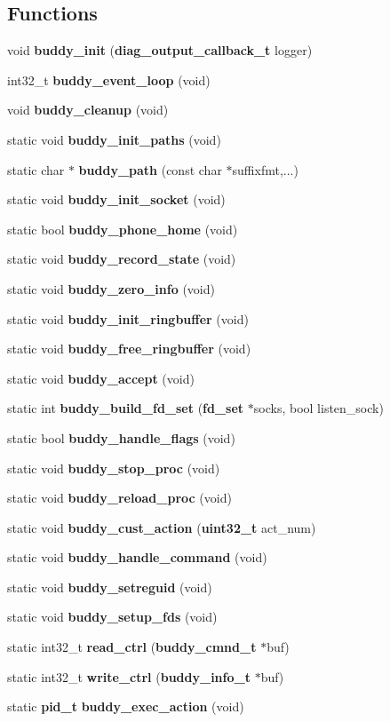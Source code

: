\subsection*{Functions}
\begin{DoxyCompactItemize}
\item 
void {\bf buddy\_\-init} ({\bf diag\_\-output\_\-callback\_\-t} logger)
\item 
int32\_\-t {\bf buddy\_\-event\_\-loop} (void)
\item 
void {\bf buddy\_\-cleanup} (void)
\item 
static void {\bf buddy\_\-init\_\-paths} (void)
\item 
static char $\ast$ {\bf buddy\_\-path} (const char $\ast$suffixfmt,...)
\item 
static void {\bf buddy\_\-init\_\-socket} (void)
\item 
static bool {\bf buddy\_\-phone\_\-home} (void)
\item 
static void {\bf buddy\_\-record\_\-state} (void)
\item 
static void {\bf buddy\_\-zero\_\-info} (void)
\item 
static void {\bf buddy\_\-init\_\-ringbuffer} (void)
\item 
static void {\bf buddy\_\-free\_\-ringbuffer} (void)
\item 
static void {\bf buddy\_\-accept} (void)
\item 
static int {\bf buddy\_\-build\_\-fd\_\-set} ({\bf fd\_\-set} $\ast$socks, bool listen\_\-sock)
\item 
static bool {\bf buddy\_\-handle\_\-flags} (void)
\item 
static void {\bf buddy\_\-stop\_\-proc} (void)
\item 
static void {\bf buddy\_\-reload\_\-proc} (void)
\item 
static void {\bf buddy\_\-cust\_\-action} ({\bf uint32\_\-t} act\_\-num)
\item 
static void {\bf buddy\_\-handle\_\-command} (void)
\item 
static void {\bf buddy\_\-setreguid} (void)
\item 
static void {\bf buddy\_\-setup\_\-fds} (void)
\item 
static int32\_\-t {\bf read\_\-ctrl} ({\bf buddy\_\-cmnd\_\-t} $\ast$buf)
\item 
static int32\_\-t {\bf write\_\-ctrl} ({\bf buddy\_\-info\_\-t} $\ast$buf)
\item 
static {\bf pid\_\-t} {\bf buddy\_\-exec\_\-action} (void)

\end{DoxyCompactItemize}
